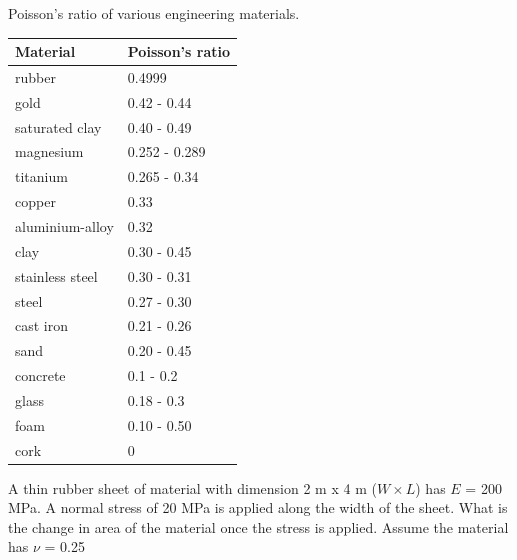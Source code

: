 \documentclass[
10pt,
a4paper,
openany,
svgnames,
]{kaobook} %
\begin{document}
\begin{margintable}
  \centering
  \caption{Poisson's ratio of various engineering materials.}
  \label{table: poisson's of materials}
  {\renewcommand\arraystretch{1.2}
    \begin{tabular}{ll}
      \toprule
      Material        & Poisson's ratio \\
      \midrule
      rubber          & 0.4999          \\
      gold            & 0.42 - 0.44       \\
      saturated clay  & 0.40 - 0.49       \\
      magnesium       & 0.252 - 0.289     \\
      titanium        & 0.265 - 0.34      \\
      copper          & 0.33            \\
      aluminium-alloy & 0.32            \\
      clay            & 0.30 - 0.45       \\
      stainless steel & 0.30 - 0.31       \\
      steel           & 0.27 - 0.30       \\
      cast iron       & 0.21 - 0.26       \\
      sand            & 0.20 - 0.45       \\
      concrete        & 0.1 - 0.2         \\
      glass           & 0.18 - 0.3        \\
      foam            & 0.10 - 0.50       \\
      cork            & 0               \\
      \bottomrule
    \end{tabular}}
\end{margintable}

\begin{example}
A thin rubber sheet of material with dimension 2 m x 4 m ($W \times L$) has $E$ = 200 MPa. A normal stress of 20 MPa is applied along the width of the sheet. What is the change in area of the material once the stress is applied. Assume the material has $\nu$ = 0.25
\end{example}
\end{document}

